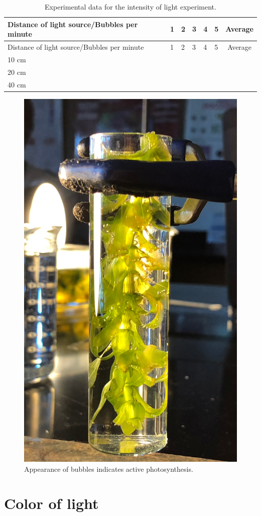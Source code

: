 \begin{longtable}[]{@{}llllllc@{}}
\caption{\label{tab:intensity} Experimental data for the intensity of light
experiment.}\tabularnewline
\toprule
Distance of light source/Bubbles per minute & 1 & 2 & 3 & 4 & 5 &
Average\tabularnewline
\midrule
\endfirsthead
\toprule
Distance of light source/Bubbles per minute & 1 & 2 & 3 & 4 & 5 &
Average\tabularnewline
\midrule
\endhead
10 cm & & & & & &\tabularnewline
20 cm & & & & & &\tabularnewline
40 cm & & & & & &\tabularnewline
\bottomrule
\end{longtable}

\begin{figure}

{\centering \includegraphics[width=0.7\linewidth]{./figures/photosynthesis/photosynthesis_bubbles}

}

\caption{Appearance of bubbles indicates active photosynthesis.}\label{fig:bubbles}
\end{figure}

\section{Color of light}\label{color-of-light}

